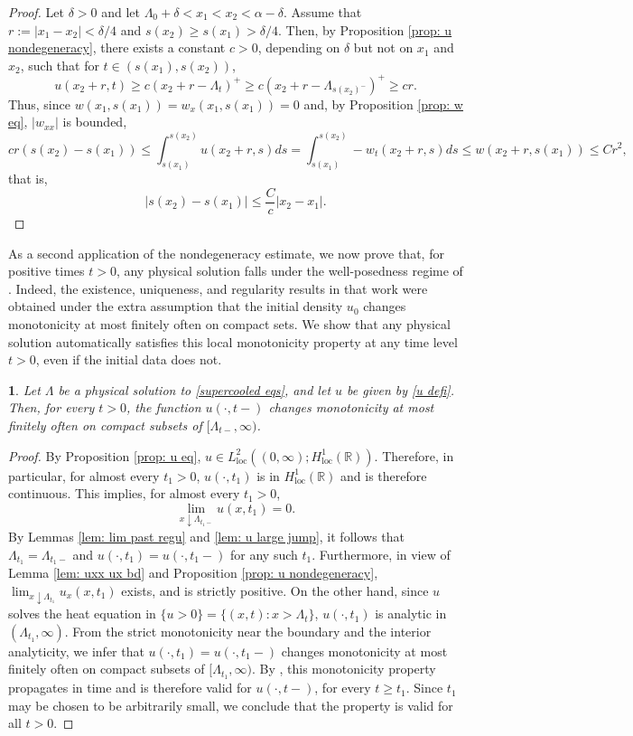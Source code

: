 \documentclass{article}
\numberwithin{equation}{section}
\numberwithin{figure}{section}
\theoremstyle{plain}
\theoremstyle{plain}
\newtheorem{prop}[thm]{\protect\propositionname}
\theoremstyle{plain}
\theoremstyle{plain}
\theoremstyle{definition}
\theoremstyle{remark}
\def\R{{\mathbb{R}}}
\providecommand{\propositionname}{Proposition}
\begin{document}
\begin{proof}
Let $\delta>0$ and let $\Lambda_0+\delta< x_1<x_2<\alpha-\delta$.  Assume that $r:=|x_1-x_2|<\delta/4$ and $s(x_2)\geq s(x_1)>\delta/4.$ Then, by Proposition \ref{prop: u nondegeneracy}, there exists a constant $c>0$, depending on $\delta$ but not on $x_1$ and $x_2$, such that for $t\in (s(x_1),s(x_2))$,
\[u(x_2+r,t)\geq c(x_2+r-\Lambda_{t})^+\geq c(x_2+r-\Lambda_{s(x_2)^-})^+\geq cr.\]
Thus, since $w(x_1,s(x_1))=w_x(x_1,s(x_1))=0$ and, by Proposition \ref{prop: w eq}, $|w_{xx}|$ is bounded,
\[cr(s(x_2)-s(x_1))\leq \int_{s(x_1)}^{s(x_2)}u(x_2+r,s)ds=\int_{s(x_1)}^{s(x_2)}-w_t(x_2+r,s)ds\leq w(x_2+r,s(x_1))\leq Cr^2,\]
that is,
\[|s(x_2)-s(x_1)|\leq \frac{C}{c}|x_2-x_1|.\]
\end{proof}
As a second application of the nondegeneracy estimate, we now prove that, for positive times $t>0$, any physical solution falls under the well-posedness regime of \cite[Thm. 1.1]{delarue}. Indeed, the existence, uniqueness, and regularity results in that work were obtained under the extra assumption that the initial density $u_0$ changes monotonicity at most finitely often on compact sets. We show that any physical solution automatically satisfies this local monotonicity property at any time level $t>0$, even if the initial data does not.
\begin{prop}\label{prop: monotonicity changes}Let $\Lambda$ be a physical solution to \eqref{supercooled eqs}, and let $u$ be given by \eqref{u defi}. Then, for every $t>0$, the function $u(\cdot,t-)$ changes monotonicity at most finitely often on compact subsets of $[\Lambda_{t-},\infty)$. 
\end{prop}
\begin{proof}
By Proposition \ref{prop: u eq}, $u\in L^{2}_{\operatorname{loc}}((0,\infty);H^1_{\operatorname{loc}}(\R)).$ Therefore, in particular, for almost every $t_1>0$, $u(\cdot,t_1)$ is in $H^{1}_{\operatorname{loc}}(\R)$ and is therefore continuous. This implies, for almost every $t_1>0$,
\begin{equation}
    \lim_{x\downarrow\Lambda_{t_1-}}u(x,t_1)=0.
\end{equation}
By Lemmas \ref{lem: lim past regu} and \ref{lem: u large jump}, it follows that $\Lambda_{t_1}=\Lambda_{t_1-}$ and $u(\cdot,t_1)=u(\cdot,t_1-)$ for any such $t_1$. Furthermore, in view of Lemma \ref{lem: uxx ux bd} and Proposition \ref{prop: u nondegeneracy}, $\lim_{x \downarrow \Lambda_{t_1}}u_x(x,t_1)$ exists, and is strictly positive. On the other hand, since $u$ solves the heat equation in $\{u>0\}=\{(x,t):x>\Lambda_t\}$, $u(\cdot,t_1)$ is analytic in $(\Lambda_{t_1},\infty)$. From the strict monotonicity near the boundary and the interior analyticity, we infer that $u(\cdot,t_1)=u(\cdot,t_1-)$ changes monotonicity at most finitely often on compact subsets of $[\Lambda_{t_1},\infty)$. By \cite[Lem.\ 4.1]{delarue}, this monotonicity property propagates in time and is therefore valid for $u(\cdot,t-)$, for every $t\geq t_1$. Since $t_1$ may be chosen to be arbitrarily small, we conclude that the property is valid for all $t>0$.    
\end{proof}
\end{document}
